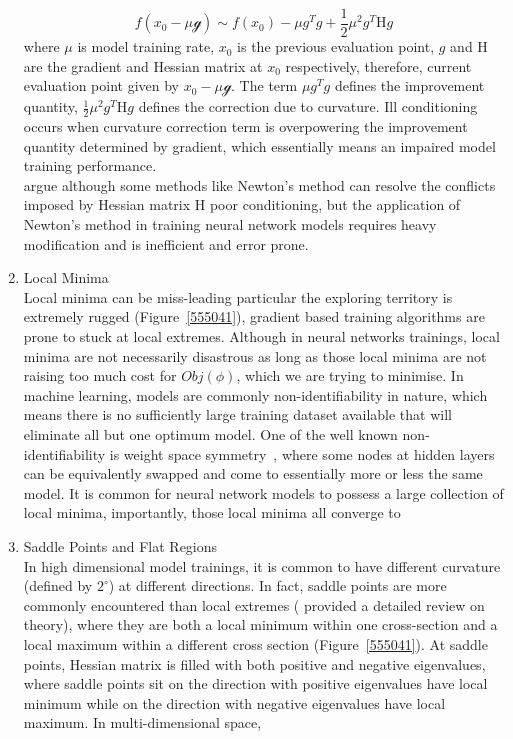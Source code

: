 \begin{enumerate}
\begin{equation}
    f(x_0-\mu\mathcal{g}) \sim f(x_0) - \mu g^Tg + \frac{1}{2}\mu^2g^T\mathrm{H}g
\end{equation}
where $\mu$ is model training rate, $x_0$ is the previous evaluation point, $g$ and $\mathrm{H}$ are the gradient and Hessian matrix at $x_0$ respectively, therefore, current evaluation point given by $x_0-\mu\mathcal{g}$. The term $\mu g^Tg$ defines the improvement quantity, $\frac{1}{2}\mu^2g^T\mathrm{H}g$ defines the correction due to curvature. Ill conditioning occurs when curvature correction term is overpowering the improvement quantity determined by gradient, which essentially means an impaired model training performance. \\
\citet{Goodfellow-et-al-2016} argue although some methods like Newton's method can resolve the conflicts imposed by Hessian matrix $\mathrm{H}$ poor conditioning, but the application of Newton's method in training neural network models requires heavy modification and is inefficient and error prone. 
    \item Local Minima \\
Local minima can be miss-leading particular the exploring territory is extremely rugged (Figure~\ref{555041}), gradient based training algorithms are prone to stuck at local extremes. Although in neural networks trainings, local minima are not necessarily disastrous as long as those local minima are not raising too much cost for $Obj(\phi)$, which we are trying to minimise. In machine learning, models are commonly non-identifiability in nature, which means there is no sufficiently large training dataset available that will eliminate all but one optimum model. One of the well known non-identifiability is weight space symmetry~\cite{BadrinarayananM15}, where some nodes at hidden layers can be equivalently swapped and come to essentially more or less the same model. It is common for neural network models to possess a large collection of local minima, importantly, those local minima all converge to 
    \item Saddle Points and Flat Regions\\
In high dimensional model trainings, it is common to have different curvature (defined by $2^\circ$) at different directions. In fact, saddle points are more commonly encountered than local extremes (\citet{DauphinPGCGB14} provided a detailed review on theory), where they are both a local minimum within one cross-section and a local maximum within a different cross section (Figure~\ref{555041}). At saddle points, Hessian matrix is filled with both positive and negative eigenvalues, where saddle points sit on the direction with positive eigenvalues have local minimum while on the direction with negative eigenvalues have local maximum. In multi-dimensional space,  \\

\end{enumerate}
